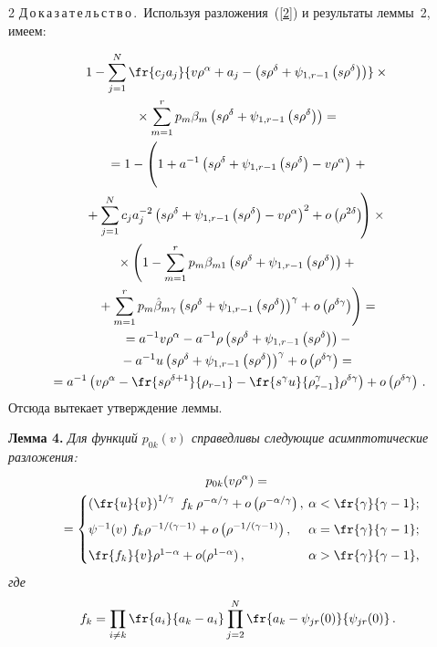 \begin{multicols}{2}
\noindent
Д\,о\,к\,а\,з\,а\,т\,е\,л\,ь\,с\,т\,в\,о\,.\
Используя разложения~(\ref{2})  и результаты леммы~2, имеем:

\noindent
\begin{multline*}
1-\sum\limits_{j=1}^N\fr{c_ja_j}{v\rho^{\alpha}+a_j-\left(s\rho^{\delta}+\psi_{1,r-1}\left(s\rho^{\delta}\right)\right)}
\times{}\\
{}\times
\sum\limits_{m=1}^rp_m\beta_m\left(s\rho^{\delta}+\psi_{1,r-1}\left(s\rho^{\delta}\right)\right)={}\\
{}=1-\left(
\vphantom{\sum\limits_{j=1}^N}
1+a^{-1}\left(s\rho^{\delta}+\psi_{1,r-1}\left(s\rho^{\delta}\right)-v\rho^{\alpha}\right)\right.+{}\\
\hspace*{-3.59697pt}\left.{}+\sum\limits_{j=1}^N
c_ja_j^{-2}\left(s\rho^{\delta}+\psi_{1,r-1}\left(s\rho^{\delta}\right)-v\rho^{\alpha}\right)^2+o\left(\rho^{2\delta}\right)
\!\right)\times{}\\
{}\times
\left(1-\sum\limits_{m=1}^rp_m\beta_{m1}
\left(s\rho^{\delta}+\psi_{1,r-1}\left(s\rho^{\delta}\right)\right)
+{}\right.\\
\left.{}+\sum\limits_{m=1}^rp_m\hat{\beta}_{m\gamma}\left(s\rho^{\delta}+\psi_{1,r-1}\left(s\rho^{\delta}\right)\right)^{\gamma}
+o\left(\rho^{\delta\gamma}\right)\right)
={}\\
{}=a^{-1}v\rho^{\alpha}-a^{-1}\rho\left(s\rho^{\delta}+\psi_{1,r-1}\left(
s\rho^{\delta}\right)\right)-{}\\
{}-a^{-1} u
\left(s\rho^{\delta}+\psi_{1,r-1}\left(s\rho^{\delta}\right)\right)^{\gamma}+
o\left(\rho^{\delta\gamma}\right)
={}\\
{}=
a^{-1}\left(v\rho^{\alpha}-\fr{s\rho^{\delta+1}}{\rho_{r-1}}-\fr{s^{\gamma}u}
{\rho_{r-1}^{\gamma}}\rho^{\delta\gamma}\right)+
o\left(\rho^{\delta\gamma}\right)\,.
\end{multline*}
Отсюда вытекает утверждение леммы.

\medskip


\noindent
\textbf{Лемма 4.} \textit{Для функций $p_{0k}(v)$ справедливы следующие асимптотические 
разложения:}
\begin{multline*}
p_{0k}(v\rho^{\alpha})
={}\\
\hspace*{-4pt}{}=\begin{cases}
\left(\fr{u}{v}\right)^{{1}/{\gamma}}\ f_k\: \rho^{-{\alpha}/{\gamma}}+
o\left(\rho^{-{\alpha}/{\gamma}}\right),&\hspace*{-6pt}\alpha<\fr{\gamma}{\gamma-1};
\\[6pt]
\psi^{-1}(v)\ f_k\rho^{-{1}/({\gamma-1})}+o\left(\rho^{-{1}/({\gamma-1})}\right),&
\hspace*{-6pt}\alpha=\fr{\gamma}{\gamma-1};\\[6pt]
\fr{f_k}{v} \rho^{1-\alpha}+o(\rho^{1-\alpha})\,,&\hspace*{-6pt}\alpha>\fr{\gamma}{\gamma-1},
\end{cases}\hspace*{-7.47086pt}
\end{multline*}
\textit{где}
$$
f_k=\prod\limits_{i\ne k}\fr{a_i}{a_k-a_i}
 \prod\limits_{j=2}^{N}\fr{a_k-\psi_{jr}(0)}{\psi_{jr}(0)}\,.
$$


\end{multicols}
